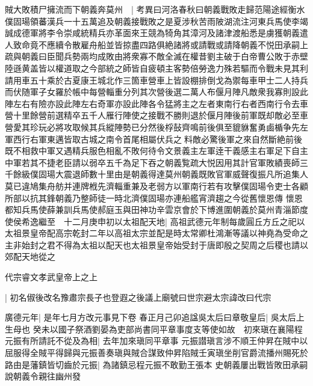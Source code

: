 賊大敗積尸擁流而下朝義奔莫州　|{
	考異曰河洛春秋曰朝義戰敗走歸范陽途經衡水僕固瑒領蕃漢兵一十五萬追及朝義接戰敗之是夏涉秋苦雨陂湖流注河東兵馬使李竭誠成德軍將李令崇咸統精兵亦革面來王競為犄角其漳河及諸津渡船悉是虜獲朝義遣人致命竟不應續令散雇舟船並皆掠盡四路俱絶諸將或請戰或請降朝義不悦田承嗣上疏與朝義曰臣聞兵勢兩均成敗由將衆寡不敵全滅在權昔劉主破于白帝曹公敗于赤壁陸遜黄盖皆以權道取之今部統之師皆自疲頓主客勢倍勞逸力殊若驅而令戰未見其利請用車五十乘於古夏康王城北作三箇車營車上皆設棚排倒戈為禦每車甲士二人持兵而伏随軍子女羅於帳中每營輜重分列其次營後選二萬人布偃月陣凡敵衆我寡則設此陣左右有險亦設此陣左右奇軍亦設此陣各令猛將主之左者東南行右者西南行令去車營十里餘營前選精卒五千人雁行陣使之接戰不勝則退於偃月陣後前軍既却敵必至車營愛其珍玩必將攻取候其兵縱陣勢已分然後桴鼔齊鳴前後俱至貔貅奮勇鹵楯争先左軍西行右軍東邁皆取古城之南令首尾相屬伏兵之料敵必驚後軍之來自然斷絶前後既不相救中軍又遇精兵服色相亂不敗何待令文景義主左軍逹干義感主右軍足下自主中軍若其不捷老臣請以弱卒五千為足下吞之朝義覧疏大悦因用其計官軍敗績喪師三千餘級僕固瑒大震退師數十里由是朝義得達莫州朝義既敗官軍威聲復振凡所追集人莫已違鳩集舟舫并連牌栰先濟輜重兼及老弱方以軍南行若有攻擊僕固瑒令吏士各顧所部以抗其鋒朝義乃整師徒一時北濟僕固瑒亦連船艦宵濟趨之今從舊懷恩傳}
懷恩都知兵馬使薛兼訓兵馬使郝庭玉與田神功辛雲京會於下博進圍朝義於莫州青淄節度使侯希逸繼至　十二月庚申初以太祖配天地|{
	高祖武德元年制每歲圓丘方丘之祀以太祖景皇帝配高宗乾封二年以高祖太宗並配是時太常卿杜鴻漸等議以神堯為受命之主非始封之君不得為太祖以配天也太祖景皇帝始受封于唐即殷之契周之后稷也請以郊配天地從之}


代宗睿文孝武皇帝上之上

|{
	初名俶後改名豫肅宗長子也登遐之後議上廟號曰世宗避太宗諱改曰代宗}


廣德元年|{
	是年七月方改元事見下卷}
春正月己卯追諡吳太后曰章敬皇后|{
	吳太后上生母也}
癸未以國子祭酒劉晏為吏部尚書同平章事度支等使如故　初來瑱在襄陽程元振有所請託不從及為相|{
	去年加來瑱同平章事}
元振譛瑱言涉不順王仲昇在賊中以屈服得全賊平得歸與元振善奏瑱與賊合謀致仲昇陷賊壬寅瑱坐削官爵流播州賜死於路由是藩鎮皆切齒於元振|{
	為諸鎮忌程元振不敢勤王張本}
史朝義屢出戰皆敗田承嗣說朝義令親往幽州發


